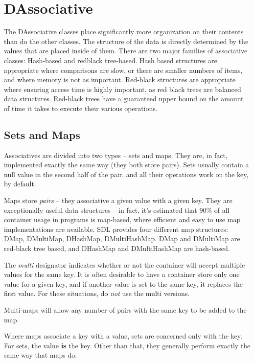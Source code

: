 \documentclass{report}
\begin{document}
\section{DAssociative}

The DAssociative classes place significantly more organization on their
contents than do the other classes. The structure of the data is directly
determined by the values that are placed inside of them. There are two major
families of associative classes: Hash-based and redblack tree-based. Hash
based structures are appropriate where comparisons are slow, or there are
smaller numbers of items, and where memory is not as important. Red-black
structures are appropriate where ensuring access time is highly important,
as red black trees are balanced data structures. Red-black trees have a
guaranteed upper bound on the amount of time it takes to execute their
various operations.

\subsection{Sets and Maps}

Associatives are divided into two types -- sets and maps.  They are, in
fact, implemented exactly the same way (they both store pairs). Sets usually
contain a null value in the second half of the pair, and all their
operations work on the key, by default.

Maps store \emph{pairs} -- they associative a given value with a given key.
They are exceptionally useful data structures -- in fact, it's estimated
that 90\% of all container usage in programs is map-based, where efficient
and easy to use map implementations are available. SDL provides four
different map structures: DMap, DMultiMap, DHashMap, DMultiHashMap.
DMap and DMultiMap are red-black tree based, and DHashMap and 
DMultiHashMap are hash-based.

The \emph{multi} designator indicates whether or not the container will
accept multiple values for the same key. It is often desirable to have a
container store only one value for a given key, and if another value is set
to the same key, it replaces the first value. For these situations,
do \emph{not} use the multi versions.

Multi-maps will allow any number of pairs with the same key to 
be added to the map.

Where maps associate a key with a value, sets are concerned only with the
key. For sets, the value \textbf{is} the key. Other than that, they
generally perform exactly the same way that maps do.
\end{document}
